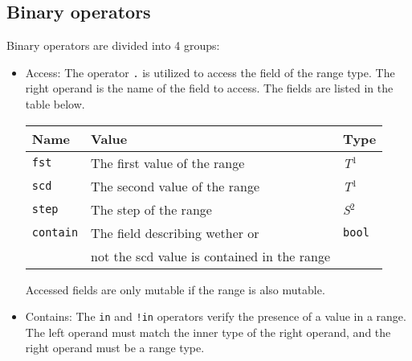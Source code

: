 \subsection {Binary operators}

Binary operators are divided into 4 groups:

\begin{itemize}
\item Access: The operator \texttt{.} is utilized to access the field of the
  range type. The right operand is the name of the field to access. The fields
  are listed in the table below.

  \begin{center}\begin{adjustbox}{max width=\linewidth}
    \begin{threeparttable}
      \begin{tabular}{|l|ll|}
        \hline
        Name & Value & Type\\
        \hline
        \hline
        \texttt {fst} & The first value of the range & \textit{T}$^{1^{\phantom{j}}}$ \\
        \texttt {scd} & The second value of the range & \textit{T}$^{1^{\phantom{j}}}$ \\
        \texttt {step} & The step of the range & \textit{S}$^{2^{\phantom{j}}}$ \\
        \texttt {contain} & The field describing wether or  & \texttt{bool} \\
        & not the scd value is contained in the range &\\
        \hline
      \end{tabular}
    \end{threeparttable}
\end{adjustbox}\end{center}

Accessed fields are only mutable if the range is also mutable.

\item Contains: The \texttt{in} and \texttt{!in} operators verify the presence
  of a value in a range. The left operand must match the inner type of the right
  operand, and the right operand must be a range type.


\end{itemize}
